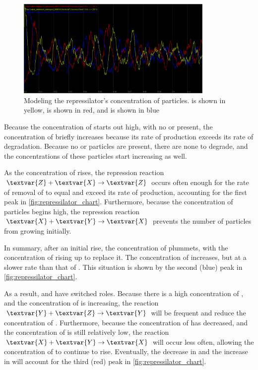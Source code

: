 \begin{qbox}\end{qbox}

\begin{figure}[h]
\centering
\mySfFamily
\includegraphics[width = 0.85\textwidth]{../images/repressilator_chart.png}
\caption{Modeling the repressilator's concentration of particles.  is shown in yellow,  is shown in red, and  is shown in blue}
\label{fig:repressilator_chart}
\end{figure}

Because the concentration of  starts out high, with no  or  present, the concentration of  briefly increases because its rate of production exceeds its rate of degradation. Because no  or  particles are present, there are none to degrade, and the concentrations of these particles start increasing as well.

As the concentration of  rises, the repression reaction $\textvar{Z} + \textvar{X} \rightarrow \textvar{Z}$ occurs often enough for the rate of removal of  to equal and exceed its rate of production, accounting for the first peak in \autoref{fig:repressilator_chart}. Furthermore, because the concentration of  particles begins high, the repression reaction $\textvar{X} + \textvar{Y} \rightarrow \textvar{X}$ prevents the number of  particles from growing initially.

In summary, after an initial rise, the concentration of  plummets, with the concentration of  rising up to replace it. The concentration of  increases, but at a slower rate than that of . This situation is shown by the second (blue) peak in \autoref{fig:repressilator_chart}.

As a result,  and  have switched roles. Because there is a high concentration of , and the concentration of  is increasing, the reaction $\textvar{Y} + \textvar{Z} \rightarrow \textvar{Y}$ will be frequent and reduce the concentration of . Furthermore, because the concentration of  has decreased, and the concentration of  is still relatively low, the reaction $\textvar{X} + \textvar{Y} \rightarrow \textvar{X}$ will occur less often, allowing the concentration of  to continue to rise. Eventually, the decrease in  and the increase in  will account for the third (red) peak in \autoref{fig:repressilator_chart}.

